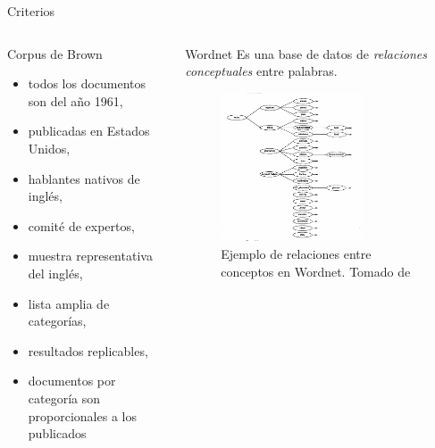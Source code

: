 \documentclass[presentation]{beamer}
\begin{document}
\begin{frame}[label={sec:orgdd42546}]{Criterios}
\begin{columns}
\begin{column}{0.48\columnwidth}
\begin{block}{Corpus de Brown}
 \small
 \begin{itemize}
 \item todos los documentos son del año 1961,
 \item publicadas en Estados Unidos,
 \item hablantes nativos de inglés,
 \item comité de expertos,
 \item  muestra representativa del inglés,
 \item lista amplia de categorías,
 \item resultados  replicables,
 \item  documentos por categoría son proporcionales a los publicados
 \end{itemize}
 \end{block}
\normalsize
\end{column}

\begin{column}{0.48\columnwidth}
\begin{block}{Wordnet}
Es una base de datos de \emph{relaciones conceptuales} entre palabras.
\end{block}




\begin{figure}
\includegraphics[width=0.7\textwidth]{./assets/wordnet-relaciones.png}
\caption{Ejemplo de relaciones entre conceptos en Wordnet. Tomado de \cite[p.30]{fellbaum_1998}}
\end{figure}
\end{column}
\end{columns}
\end{frame}
\end{document}
